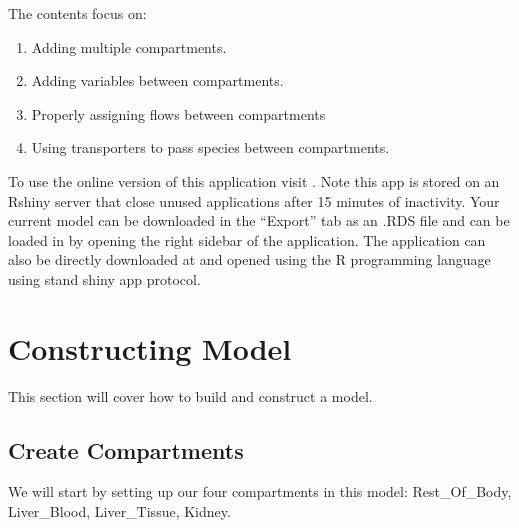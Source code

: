 \documentclass[letterpaper,10pt,english]{sphinxmanual}
\begin{document}
\sphinxAtStartPar
The contents focus on:
\begin{enumerate}
%
\item {} 
\sphinxAtStartPar
Adding multiple compartments.

\item {} 
\sphinxAtStartPar
Adding variables between compartments.

\item {} 
\sphinxAtStartPar
Properly assigning flows between compartments

\item {} 
\sphinxAtStartPar
Using transporters to pass species between compartments.

\end{enumerate}

\sphinxAtStartPar
To use the online version of this application visit
.  Note this app is stored on an Rshiny server
that close unused applications after 15 minutes of inactivity. Your current
model can be downloaded in the “Export” tab as an .RDS file and can be loaded
in by opening the right sidebar of the application. The application can also
be directly downloaded at
 and opened using the
R programming language using stand shiny app protocol.


\section{Constructing Model}
\label{\detokenize{pages/tutorial_mc/1_construct_model:constructing-model}}\label{\detokenize{pages/tutorial_mc/1_construct_model::doc}}
\sphinxAtStartPar
This section will cover how to build and construct a model.


\subsection{Create Compartments}
\label{\detokenize{pages/tutorial_mc/addCompartments:create-compartments}}\label{\detokenize{pages/tutorial_mc/addCompartments::doc}}
\sphinxAtStartPar
We will start by setting up our four compartments in this model:
Rest\_Of\_Body, Liver\_Blood, Liver\_Tissue, Kidney.
\end{document}
